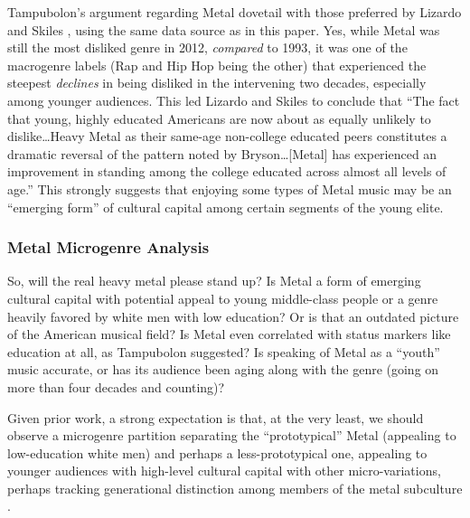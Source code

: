 \documentclass[a4paper,12pt]{extarticle}
\begin{document}
Tampubolon's argument regarding Metal dovetail with those preferred by Lizardo and Skiles \citeyearpar{lizardo_skiles15}, using the same data source as in this paper. Yes, while Metal was still the most disliked genre in 2012, \textit{compared} to 1993, it was one of the macrogenre labels (Rap and Hip Hop being the other) that experienced the steepest \textit{declines} in being disliked in the intervening two decades, especially among younger audiences. This led Lizardo and Skiles \citeyearpar[][18]{lizardo_skiles15} to conclude that ``The fact that young, highly educated Americans are now about as equally unlikely to dislike\ldots Heavy Metal as their same-age non-college educated peers constitutes a dramatic reversal of the pattern noted by Bryson\ldots [Metal] has experienced an improvement in standing among the college educated across almost all levels of age.'' This strongly suggests that enjoying some types of Metal music may be an ``emerging form'' of cultural capital \cite{prieur2013emerging} among certain segments of the young elite.  

\subsubsection{Metal Microgenre Analysis}
So, will the real heavy metal please stand up? Is Metal a form of emerging cultural capital with potential appeal to young middle-class people or a genre heavily favored by white men with low education? Or is that an outdated picture of the American musical field? Is Metal even correlated with status markers like education at all, as Tampubolon suggested? Is speaking of Metal as a ``youth'' music accurate, or has its audience been aging along with the genre (going on more than four decades and counting)? 

Given prior work, a strong expectation is that, at the very least, we should observe a microgenre partition separating the ``prototypical'' Metal (appealing to low-education white men) and perhaps a less-prototypical one, appealing to younger audiences with high-level cultural capital with other micro-variations, perhaps tracking generational distinction among members of the metal subculture \citep{lizardo_skiles15}.
\end{document}
